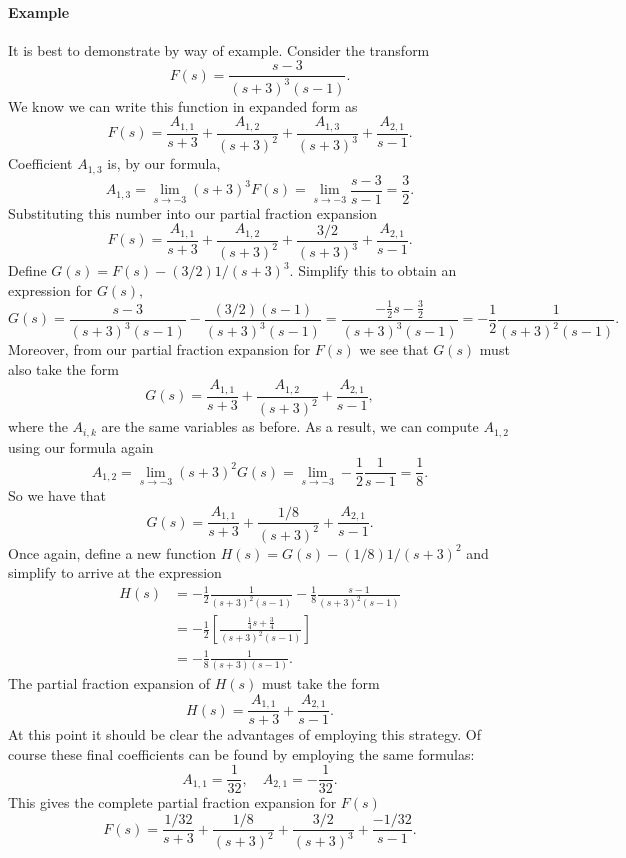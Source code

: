 \paragraph{Example}
It is best to demonstrate by way of example.
Consider the transform
\[
  F(s)
    =
      \frac{s - 3}{(s + 3)^3 (s - 1)}.
\]
We know we can write this function in expanded form as
\[
  F(s)
    =
      \frac{A_{1,1}}{s + 3} + \frac{A_{1,2}}{(s + 3)^2} + \frac{A_{1,3}}{(s + 3)^3}
      +
      \frac{A_{2,1}}{s - 1}. 
\]
Coefficient \(A_{1, 3}\) is, by our formula,
\[
  A_{1, 3} 
    =
      \lim_{s \to -3} (s + 3)^3 F(s)
    =
      \lim_{s \to -3} \frac{s - 3}{s - 1}
    =
      \frac{3}{2}.
\]
Substituting this number into our partial fraction expansion
\[
  F(s)
    =
      \frac{A_{1,1}}{s + 3} + \frac{A_{1,2}}{(s + 3)^2} + \frac{3/2}{(s + 3)^3}
      +
      \frac{A_{2,1}}{s - 1}. 
\]
Define \(G(s) = F(s) - (3/2)1/(s + 3)^3.\)
Simplify this to obtain an expression for \(G(s),\)
\[
  G(s)
    =
      \frac{s - 3}{(s + 3)^3 (s - 1)} - \frac{(3/2)(s - 1)}{(s + 3)^3 (s - 1)}
    =
      \frac{-\frac{1}{2}s - \frac{3}{2}}{(s + 3)^3 (s - 1)}
    =
      -\frac{1}{2}
      \frac{1}{(s+3)^2 (s - 1)}.
\]
Moreover, from our partial fraction expansion for \(F(s)\) we see that \(G(s)\) must also take the form
\[
  G(s)
    =
      \frac{A_{1,1}}{s + 3} + \frac{A_{1,2}}{(s + 3)^2}
      +
      \frac{A_{2,1}}{s - 1},
\]
where the \(A_{i, k}\) are the same variables as before.
As a result, we can compute \(A_{1, 2}\) using our formula again
\[
  A_{1, 2} 
    =
      \lim_{s \to -3} (s + 3)^2 G(s)
    =
      \lim_{s \to -3} -\frac{1}{2}\frac{1}{s - 1}
    =
      \frac{1}{8}.
\]
So we have that
\[
  G(s)
    =
      \frac{A_{1,1}}{s + 3} + \frac{1/8}{(s + 3)^2}
      +
      \frac{A_{2,1}}{s - 1}.
\]
Once again, define a new function \(H(s) = G(s) - (1/8) 1/(s+3)^2\) and simplify to arrive at the expression
\[
\begin{aligned}
  H(s) 
    &=
      -\frac{1}{2}
      \frac{1}{(s+3)^2 (s - 1)}
      -
      \frac{1}{8}
      \frac{s - 1}{(s+3)^2 (s-1)}\\
    &=
      -\frac{1}{2}
      \left[
        \frac{\frac{1}{4} s + \frac{3}{4}}{(s+3)^2 (s-1)}
      \right]\\
    &=
      -\frac{1}{8}
      \frac{1}{(s+3)(s-1)}.
\end{aligned}
\] 
The partial fraction expansion of \(H(s)\) must take the form
\[
  H(s)
    =
      \frac{A_{1,1}}{s + 3}
      +
      \frac{A_{2,1}}{s - 1}.
\]
At this point it should be clear the advantages of employing this strategy.
Of course these final coefficients can be found by employing the same formulas:
\[
  A_{1, 1} = \frac{1}{32},\quad A_{2,1} = -\frac{1}{32}.
\]
This gives the complete partial fraction expansion for \(F(s)\)
\[
  F(s)
    =
      \frac{1/32}{s + 3} + \frac{1/8}{(s + 3)^2} + \frac{3/2}{(s + 3)^3}
      +
      \frac{-1/32}{s - 1}. 
\]
